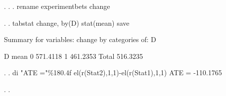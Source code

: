 . 
. 
. rename experimentbets change

. 
. tabstat change, by(D) stat(mean) save   

Summary for variables: change
     by categories of: D 

       D {\VBAR}      mean
       0 {\VBAR}  571.4118
       1 {\VBAR}  461.2353
   Total {\VBAR}  516.3235

. 
. di "ATE ="\%180.4f el(r(Stat2),1,1)-el(r(Stat1),1,1)
ATE =                 -110.1765

. 
.         
